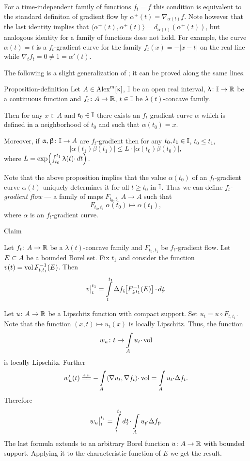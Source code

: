 \documentclass[oneside,a4paper]{article}
\begin{document}
For a time-independent family of functions $f_t=f$ this condition is equivalent to the standard definiton of gradient flow by $\alpha^+(t)=\nabla_{\alpha(t)} f$.
Note however that the last identity implies that $\langle\alpha^+(t),\alpha^+(t)\rangle=d_{\alpha(t)}(\alpha^+(t))$, but analogous identity for a family of functions dose not hold.
For example, the curve $\alpha(t)=t$ is a $f_t$-gradient curve for the family $f_t(x)=-|x-t|$ on the real line while $\nabla_t f_t=0\ne 1=\alpha'(t)$.

The following is a slight generalization of \cite[2.1.2$\&$2.2(2)]{petrunin:survey}; it can be proved along the same lines.

\begin{thm}{Proposition-definition}\label{prop-def}
Let $A\in\CBB m\kappa$,
$\mathbb{I}$ be an open real interval, 
$\uplambda\colon\mathbb{I}\to\mathbb{R}$ be a continuous function and 
$f_t\colon A\to \mathbb{R}$, $t\in \mathbb{I}$ be $\lambda(t)$-concave family.

Then for any $x\in A$ and $t_0\in \mathbb{I}$ there exists an $f_t$-gradient curve $\alpha$ which is defined in a neighborhood of $t_0$ and such that $\alpha(t_0)=x$.

Moreover, if $\upalpha,\upbeta\colon\mathbb{I}\to A$ are $f_t$-gradient then for any $t_0,t_1\in\mathbb{I}$, $t_0\le t_1$,
$$|\alpha(t_1)\beta(t_1)|\le L{\cdot}|\alpha(t_0)\beta(t_0)|,$$
where $L=\exp\!\left(\int_{t_0}^{t_1}\uplambda(t){\cdot}\,d t\right).$
\end{thm}

Note that the above proposition implies that the value $\alpha(t_0)$ of an $f_t$-gradient curve $\alpha(t)$ uniquely determines it for all $t\ge t_0$ in $\mathbb{I}$. 
Thus we can define \emph{$f_t$-gradient flow} --- a family of maps $F_{{t_0},{t_1}}\: A\to A$ such that
$$F_{{t_0},{t_1}}\:\alpha(t_0)\mapsto\alpha(t_1),$$
where $\alpha$ is an $f_t$-gradient curve.

\begin{thm}{Claim}\label{vol-lap}
{\sloppy Let $f_t\colon A\to\mathbb{R}$ be a $\lambda(t)$-concave family and $F_{{t_0},{t_1}}$ be $f_t$-gradient flow.
Let $E\subset A$ be a bounded Borel set. 
Fix $t_1$ and consider the function 
\hbox{$v(t)=\mathop{\rm vol}\nolimits F^{-1}_{{t},{t_1}}(E)$}.
Then 
$$\bigl.v\bigr|_t^{t_1}
=
\int\limits_t^{t_1}\Lap f_\under{t}\l[F^{-1}_{\under{t},{t_1}}(E)\r]{\cdot}\,d\under{t}.$$

}
\end{thm}

Let $u\colon A\to\mathbb{R}$ be a Lipschitz function with compact support.
Set $u_t=u\circ F_{{t},{t_1}}$.
Note that the function $(x,t)\mapsto u_t(x)$ is locally Lipschitz.
Thus, the function 
$$w_u\colon t\mapsto \int\limits_A u_t{\cdot}\mathop{\rm vol}\nolimits$$ 
is locally Lipschitz.
Further
$$w_u'(t)\ae
-\int\limits_A \<\nabla u_t,\nabla f_t\>{\cdot}\vol
=
\int\limits_A u_t{\cdot}\Lap f_t.$$
Therefore 
$$\bigl.w_u\bigr|_t^{t_1}
=
\int\limits_t^{t_1}d\under{t}\cdot\int\limits_A u_{\under{t}}{\cdot}\Lap f_{\under{t}}.$$
The last formula extends to an arbitrary Borel function $u\colon A\to\mathbb{R}$ with bounded support.
Applying it to the characteristic function of $E$ we get the result.
\qeds
\end{document}
